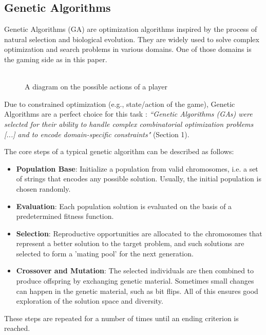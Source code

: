 \documentclass[sigconf]{acmart} %
\begin{document}
\subsection{Genetic Algorithms}
Genetic Algorithms (GA) are optimization algorithms inspired by the process of natural selection and biological evolution. They are widely used to solve complex optimization and search problems in various domains. 
One of those domains is the gaming side as in this paper. 
\begin{figure}
      \centering
      \includegraphics[width = 0.5, scale =1.5\linewidth]{pictures/possibleActionsPlayer.png}
      \caption{\label{fig:possibleActionsPlayer}A diagram on the possible actions of a player}
      \end{figure}
Due to constrained optimization (e.g., state/action of the game), Genetic Algorithms are a perfect choice for this task \cite{popescu2025}: 
\textit{``Genetic Algorithms (GAs) were selected for their ability to handle complex combinatorial optimization problems [...] and to encode domain-specific constraints"} (Section 1).

The core steps of a typical genetic algorithm can be described as follows:
\begin{itemize}
    \item \textbf{Population Base}: Initialize a population from valid chromosomes, i.e. a set of strings that encodes any possible solution. Usually, the initial population is chosen randomly.
    \item \textbf{Evaluation}: Each population solution is evaluated on the basis of a predetermined fitness function.
    \item \textbf{Selection}: Reproductive opportunities are allocated to the chromosomes that represent a better solution to the target problem, and such solutions are selected to form a 'mating pool' for the next generation.
    \item \textbf{Crossover and Mutation}: The selected individuals are then combined to produce offspring by exchanging genetic material. Sometimes small changes can happen in the genetic material, such as bit flips. All of this ensures good exploration of the solution space and diversity.
    
\end{itemize}
These steps are repeated for a number of times until an ending criterion is reached.
\end{document}
